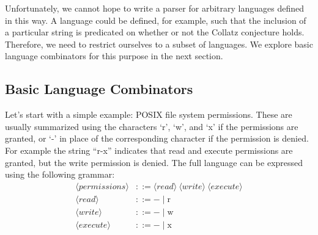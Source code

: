 Unfortunately, we cannot hope to write a parser for arbitrary languages defined in this way. A language could be defined, for example, such that the inclusion of a particular string is predicated on whether or not the Collatz conjecture holds.
Therefore, we need to restrict ourselves to a subset of languages.
We explore basic language combinators for this purpose in the next section.

\subsection{Basic Language Combinators}

Let's start with a simple example: POSIX file system permissions. These are usually summarized using the characters `r', `w', and `x' if the permissions are granted, or `-' in place of the corresponding character if the permission is denied. For example the string ``r-x'' indicates that read and execute permissions are granted, but the write permission is denied. The full language can be expressed using the following grammar:
\begin{align*}
\langle\textit{permissions}\rangle & ::= \langle\textit{read}\rangle~\langle\textit{write}\rangle~\langle\textit{execute}\rangle \\
\langle\textit{read}\rangle & ::= - \mid \textrm{r} \\
\langle\textit{write}\rangle & ::= - \mid \textrm{w} \\
\langle\textit{execute}\rangle & ::= - \mid \textrm{x}
\end{align*}

\begin{code}[hide]%
%
\>[4]\AgdaSpace{}%
\AgdaSpace{}%
\AgdaSpace{}%
\AgdaSpace{}%
\AgdaSymbol{:}\AgdaSpace{}%
\<%
\end{code}


